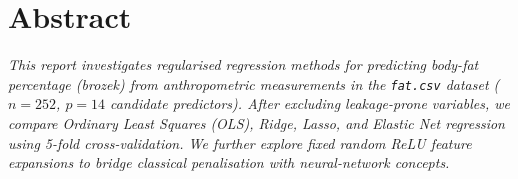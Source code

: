\section*{Abstract}


\textit{%
This report investigates regularised regression methods for predicting body-fat
percentage (brozek) from anthropometric measurements in the \texttt{fat.csv}
dataset ($n = 252$, $p = 14$ candidate predictors).  After excluding
leakage-prone variables, we compare Ordinary Least Squares (OLS), Ridge, Lasso,
and Elastic Net regression using 5-fold cross-validation.  We further explore
fixed random ReLU feature expansions to bridge classical penalisation with
neural-network concepts.
}

\bigskip
